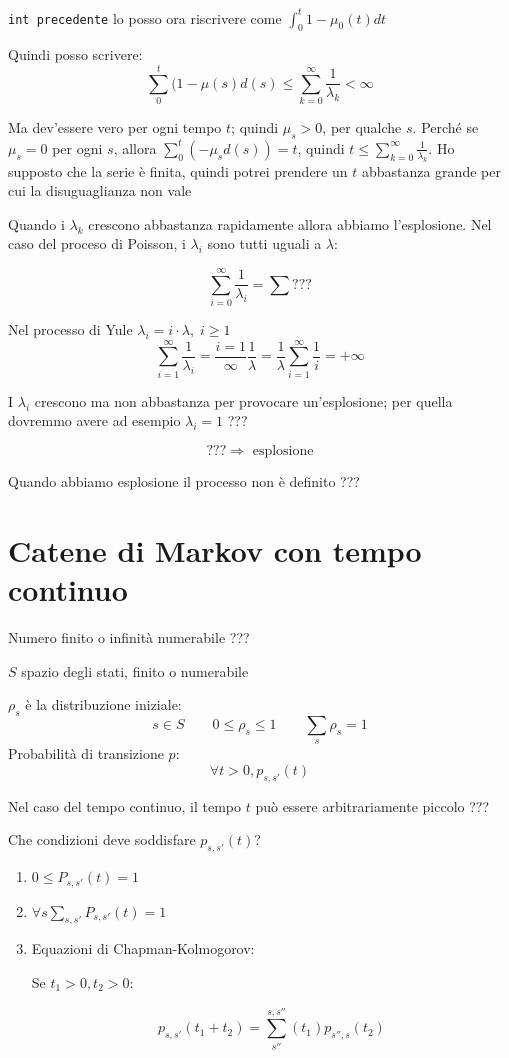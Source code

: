 \documentclass[a4paper,12pt]{book}
\begin{document}
\texttt{int precedente} %
 lo posso ora riscrivere come $ \int_0^t 1 - \mu_0 (t) dt $

 Quindi posso scrivere:
$$ \sum_0^t (1 - \mu(s) d(s)  \le \sum_{k=0}^\infty \frac{1}{\lambda_k} < \infty $$ %

Ma dev'essere vero per ogni tempo $ t $; quindi $ \mu_s > 0 $, per qualche $ s $. Perché se $\mu_s = 0$ per ogni $ s $, allora $\sum_{0}^{t}(-\mu_s d(s)) = t$, quindi $ t\le \sum_{k=0}^{\infty}\frac{1}{\lambda_k} $. Ho supposto che la serie è finita, quindi potrei prendere un $ t $ abbastanza grande per cui la disuguaglianza non vale %

Quando i $\lambda_k$ crescono abbastanza rapidamente allora abbiamo l'esplosione. Nel caso del proceso di Poisson, i $\lambda_i$ sono tutti uguali a $\lambda$:

$$ \sum_{i=0}^{\infty} \frac{1}{\lambda_i} = \sum ??? $$ %


Nel processo di Yule $\lambda_i = i\cdot \lambda, \; i \ge 1$
$$ \sum_{i=1}^\infty \frac{1}{\lambda_i} = \frac{i=1}{\infty} \frac{1}{\lambda} = \frac{1}{\lambda} \sum_{i=1}^\infty \frac{1}{i} = +\infty$$

I $\lambda_i$ crescono ma non abbastanza per provocare un'esplosione; per quella dovremmo avere ad esempio $\lambda_i = 1$ ??? %

$$ ??? \Rightarrow \text{ esplosione} $$ %

Quando abbiamo esplosione il processo non è definito ??? %
 
\chapter{Catene di Markov con tempo continuo} %
Numero finito o infinità numerabile ??? %

$ S $ spazio degli stati, finito o numerabile

$\rho_s$ è la distribuzione iniziale:
$$ s \in S \qquad 0 \le \rho_s \le 1 \qquad \sum_{s} \rho_s = 1 $$
Probabilità di transizione $ p $:
$$ \forall t > 0, p_{s,s'}(t)  $$

Nel caso del tempo continuo, il tempo $ t $ può essere arbitrariamente piccolo ??? %

Che condizioni deve soddisfare $ p_{s,s'}(t) $?

\begin{enumerate}
	\item $ 0 \le P_{s,s'}(t) = 1 $
	\item $ \forall s \sum_{s,s'} P_{s,s'}(t) = 1 $
	\item Equazioni di Chapman-Kolmogorov:
	
	Se $ t_1 > 0, t_2 > 0 $:
	
	$$ p_{s,s'}(t_1 + t_2) = \sum_{s''}^{s,s''} (t_1) p_{s'',s}(t_2) $$
\end{enumerate}
\end{document}
